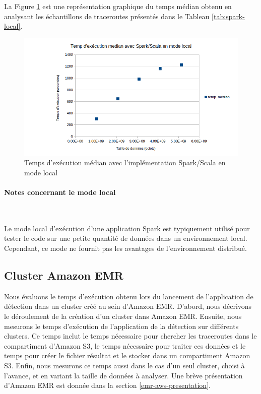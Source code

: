 La Figure \ref{fig:spark-localmode} est une représentation graphique du temps médian obtenu en analysant les échantillons de traceroutes présentés dans le Tableau \ref{tab:spark-local}.

\begin{figure}[h]
	\centering
	\includegraphics[width=\linewidth]{illustrations/spark-localmode1}
	\caption{Temps d'exécution médian avec l'implémentation  Spark/Scala en mode local}
	\label{fig:spark-localmode}
\end{figure}

\paragraph{Notes concernant le mode local}~

Le mode local d'exécution d'une application Spark est typiquement utilisé pour tester le code sur une petite quantité de données dans un environnement local. Cependant, ce mode  ne fournit pas les avantages de l'environnement distribué. 

\subsection{Cluster Amazon EMR}

Nous évaluons le temps d'exécution obtenu lors du lancement de l'application de détection dans un cluster créé au sein d'Amazon EMR. D'abord, nous  décrivons le déroulement de la création d'un cluster dans Amazon EMR. Ensuite, nous mesurons le temps d'exécution de l'application de la détection sur différents clusters. Ce temps inclut le temps nécessaire  pour chercher les traceroutes dans le compartiment d'Amazon S3, le temps nécessaire pour traiter ces données et  le temps pour créer le fichier résultat et le stocker dans un compartiment Amazon S3. Enfin, nous mesurons ce temps  aussi dans le cas d'un seul cluster, choisi à l'avance, et en variant la taille  de données à analyser. Une brève présentation d'Amazon EMR est donnée dans la section \ref{emr-aws-presentation}.


